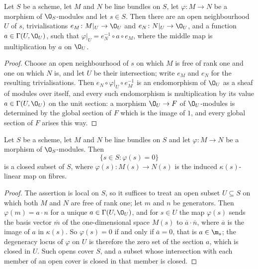 \begin{lemma}
\label{lem:cube-trivialising-open}
\leanok
Let $S$ be a scheme, let $M$ and $N$ be line bundles on $S$, let
$\varphi\colon M\to N$ be a morphism of $\O_S$-modules and let $s\in S$.  Then
there are an open neighbourhood $U$ of $s$, trivialisations
$e_M\colon M|_U\to\O_U$ and $e_N\colon N|_U\to\O_U$, and a function
$a\in\Gamma(U,\O_U)$, such that $\varphi|_U=e_N^{-1}\circ a\circ e_M$, where the
middle map is multiplication by $a$ on $\O_U$.
\end{lemma}
\begin{proof}
\leanok
Choose an open neighbourhood of $s$ on which $M$ is free of rank one and one on
which $N$ is, and let $U$ be their intersection; write $e_M$ and $e_N$ for the
resulting trivialisations.  Then $e_N\circ\varphi|_U\circ e_M^{-1}$ is an
endomorphism of $\O_U$ as a sheaf of modules over itself, and every such
endomorphism is multiplication by its value $a\in\Gamma(U,\O_U)$ on the unit
section: a morphism $\O_U\to F$ of $\O_U$-modules is determined by the global
section of $F$ which is the image of $1$, and every global section of $F$ arises
this way.
\end{proof}

\begin{lemma}
\label{lem:cube-degeneracy-closed}
\leanok
Let $S$ be a scheme, let $M$ and $N$ be line bundles on $S$ and let
$\varphi\colon M\to N$ be a morphism of $\O_S$-modules.  Then
\[
  \{s\in S:\varphi(s)=0\}
\]
is a closed subset of $S$, where $\varphi(s)\colon M(s)\to N(s)$ is the
induced $\kappa(s)$-linear map on fibres.
\end{lemma}
\begin{proof}
\leanok
The assertion is local on $S$, so it suffices to treat an open subset
$U\subseteq S$ on which both $M$ and $N$ are free of rank one; let $m$ and $n$
be generators.  Then $\varphi(m)=a\cdot n$ for a unique
$a\in\Gamma(U,\O_U)$, and for $s\in U$ the map $\varphi(s)$ sends the basis
vector $\overline m$ of the one-dimensional space $M(s)$ to
$\overline a\cdot\overline n$, where $\overline a$ is the image of $a$ in
$\kappa(s)$.  So $\varphi(s)=0$ if and only if $\overline a=0$, that is
$a\in\m_s$; the degeneracy locus of $\varphi$ on $U$ is therefore the zero set
of the section $a$, which is closed in $U$.  Such opens cover $S$, and a
subset whose intersection with each member of an open cover is closed in that
member is closed.
\end{proof}

